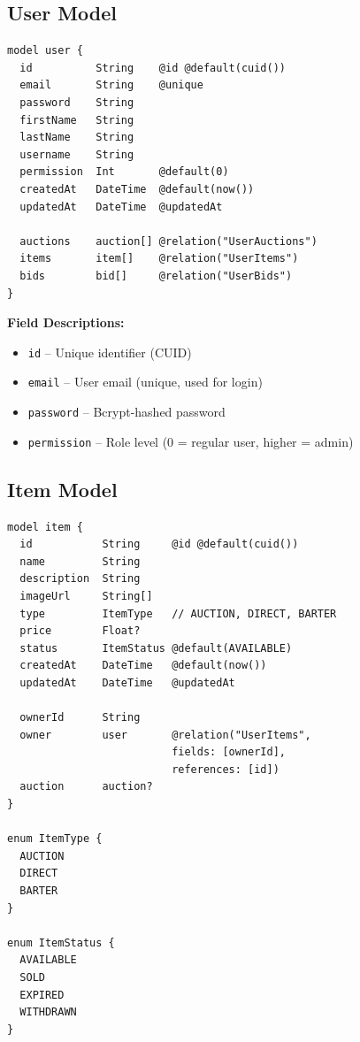 \documentclass[12pt,a4paper]{report}
\begin{document}
\subsection{User Model}

\begin{lstlisting}[caption=User Schema (Prisma)]
model user {
  id          String    @id @default(cuid())
  email       String    @unique
  password    String
  firstName   String
  lastName    String
  username    String
  permission  Int       @default(0)
  createdAt   DateTime  @default(now())
  updatedAt   DateTime  @updatedAt

  auctions    auction[] @relation("UserAuctions")
  items       item[]    @relation("UserItems")
  bids        bid[]     @relation("UserBids")
}
\end{lstlisting}

\textbf{Field Descriptions:}
\begin{itemize}
    \item \texttt{id} -- Unique identifier (CUID)
    \item \texttt{email} -- User email (unique, used for login)
    \item \texttt{password} -- Bcrypt-hashed password
    \item \texttt{permission} -- Role level (0 = regular user, higher = admin)
\end{itemize}

\subsection{Item Model}

\begin{lstlisting}[caption=Item Schema (Prisma)]
model item {
  id           String     @id @default(cuid())
  name         String
  description  String
  imageUrl     String[]   
  type         ItemType   // AUCTION, DIRECT, BARTER
  price        Float?     
  status       ItemStatus @default(AVAILABLE)
  createdAt    DateTime   @default(now())
  updatedAt    DateTime   @updatedAt

  ownerId      String
  owner        user       @relation("UserItems", 
                          fields: [ownerId], 
                          references: [id])
  auction      auction?
}

enum ItemType {
  AUCTION
  DIRECT
  BARTER
}

enum ItemStatus {
  AVAILABLE
  SOLD
  EXPIRED
  WITHDRAWN
}
\end{lstlisting}
\end{document}
